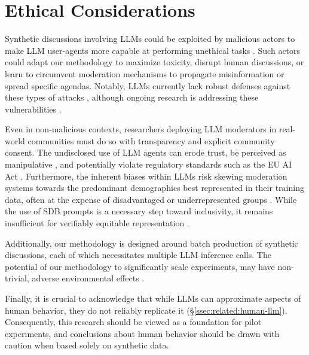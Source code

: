 %
\section{Ethical Considerations}
\label{sec:ethical}

Synthetic discussions involving \acp{LLM} could be exploited by malicious actors to make \ac{LLM} user-agents more capable at performing unethical tasks \cite{majumdar_2024_nefarious, MARULLI20245340}. Such actors could adapt our methodology to  maximize toxicity, disrupt human discussions, or learn to circumvent moderation mechanisms to propagate misinformation or spread specific agendas. Notably, \acp{LLM} currently lack robust defenses against these types of attacks \cite{li_2025_vulnerable}, although ongoing research is addressing these vulnerabilities \cite{wang_2025_risk}.

Even in non-malicious contexts, researchers deploying \ac{LLM} moderators in real-world communities must do so with transparency and explicit community consent. The undisclosed use of \ac{LLM} agents can erode trust, be perceived as manipulative \cite{retraction_watch}, and potentially violate regulatory standards such as the EU AI Act \cite{eu_ai_act_2024}. Furthermore, the inherent biases within \acp{LLM} risk skewing moderation systems towards the predominant demographics best represented in their training data, often at the expense of disadvantaged or underrepresented groups \cite{rossi_2024, anthis_2025, burton2024large}. While the use of \ac{SDB} prompts is a necessary step toward inclusivity, it remains insufficient for verifiably equitable representation \cite{rossi_2024}.

Additionally, our methodology is designed around batch production of synthetic discussions, each of which necessitates multiple \ac{LLM} inference calls. The potential of our methodology to significantly scale experiments, may have non-trivial, adverse environmental effects \cite{ding_2024_sustainable, Ren2024}. 

Finally, it is crucial to acknowledge that while \acp{LLM} can approximate aspects of human behavior, they do not reliably replicate it (\S\ref{ssec:related:human-llm}). Consequently, this research should be viewed as a foundation for pilot experiments, and conclusions about human behavior should be drawn with caution when based solely on synthetic data.